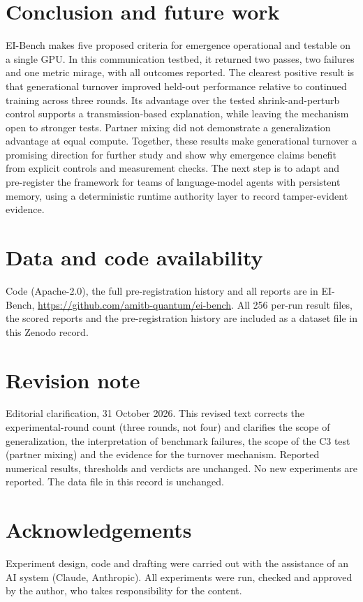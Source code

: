 \documentclass[11pt]{article}
\begin{document}
\section{Conclusion and future work}

EI-Bench makes five proposed criteria for emergence operational and testable on a single GPU. In
this communication testbed, it returned two passes, two failures and one metric mirage, with all
outcomes reported. The clearest positive result is that generational turnover improved held-out
performance relative to continued training across three rounds. Its advantage over the tested
shrink-and-perturb control supports a transmission-based explanation, while leaving the mechanism
open to stronger tests. Partner mixing did not demonstrate a generalization advantage at equal
compute. Together, these results make generational turnover a promising direction for further
study and show why emergence claims benefit from explicit controls and measurement checks. The
next step is to adapt and pre-register the framework for teams of language-model agents with
persistent memory, using a deterministic runtime authority layer to record tamper-evident evidence.

\section*{Data and code availability}
Code (Apache-2.0), the full pre-registration history and all reports are in EI-Bench,
\url{https://github.com/amitb-quantum/ei-bench}. All 256 per-run result files, the scored reports and the
pre-registration history are included as a dataset file in this Zenodo record.

\section*{Revision note}
Editorial clarification, 31 October 2026. This revised text corrects the experimental-round count
(three rounds, not four) and clarifies the scope of generalization, the interpretation of benchmark
failures, the scope of the C3 test (partner mixing) and the evidence for the turnover mechanism.
Reported numerical results, thresholds and verdicts are unchanged. No new experiments are reported.
The data file in this record is unchanged.

\section*{Acknowledgements}
Experiment design, code and drafting were carried out with the assistance of an AI system
(Claude, Anthropic). All experiments were run, checked and approved by the author, who takes
responsibility for the content.
\end{document}
